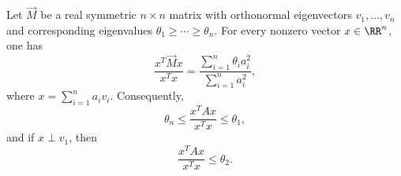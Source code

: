 \begin{lemma}
	\label{lem:adjacency-rayleigh-principle}
	Let \(\vec{M}\) be a real symmetric \(n\times n\) matrix with orthonormal eigenvectors \(v_1,\ldots,v_n\) and corresponding eigenvalues \(\theta_1\geq\cdots\geq\theta_n\). For every nonzero vector \(x\in\RR^n\), one has
	\begin{equation}
		\frac{x^T\vec{M}x}{x^T x}
		=
		\frac{\sum_{i=1}^n\theta_i a_i^2}{\sum_{i=1}^n a_i^2},
	\end{equation}
	where \(x=\sum_{i=1}^n a_i v_i\). Consequently,
	\begin{equation}
		\theta_n\leq \frac{x^T A x}{x^T x}\leq \theta_1,
	\end{equation}
	and if \(x\perp v_1\), then
	\begin{equation}
		\frac{x^T A x}{x^T x}\leq \theta_2.
	\end{equation}
\end{lemma}

